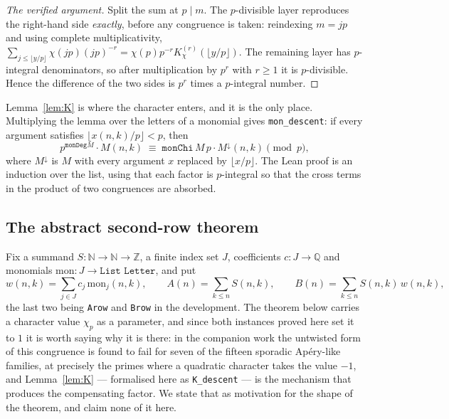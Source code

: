 \documentclass[11pt,reqno]{amsart}
\theoremstyle{plain}
\theoremstyle{definition}
\theoremstyle{remark}
\newcommand{\Z}{\mathbb{Z}}
\newcommand{\Q}{\mathbb{Q}}
\newcommand{\N}{\mathbb{N}}
\newcommand{\Ln}[1]{\texttt{#1}}
\numberwithin{equation}{section}
\begin{document}
\begin{proof}[The verified argument]
Split the sum at $p\mid m$. The $p$-divisible layer reproduces the right-hand side
\emph{exactly}, before any congruence is taken: reindexing $m=jp$ and using complete
multiplicativity,
$\sum_{j\le\lfloor y/p\rfloor}\chi(jp)(jp)^{-r}=\chi(p)p^{-r}K^{(r)}_\chi(\lfloor
y/p\rfloor)$. The remaining layer has $p$-integral denominators, so after multiplication by
$p^{r}$ with $r\ge1$ it is $p$-divisible. Hence the difference of the two sides is
$p^r$ times a $p$-integral number.
\end{proof}

Lemma~\ref{lem:K} is where the character enters, and it is the only place. Multiplying the
lemma over the letters of a monomial gives \Ln{mon\_descent}: if every argument satisfies
$\lfloor x(n,k)/p\rfloor<p$, then
\[
   p^{\Ln{monDeg}M}\cdot M(n,k)\;\equiv\;\Ln{monChi}\,M\,p\cdot M^{\downarrow}(n,k)\pmod p,
\]
where $M^\downarrow$ is $M$ with every argument $x$ replaced by $\lfloor x/p\rfloor$. The
Lean proof is an induction over the list, using that each factor is $p$-integral so that the
cross terms in the product of two congruences are absorbed.

\subsection{The abstract second-row theorem}

Fix a summand $S:\N\to\N\to\Z$, a finite index set $J$, coefficients $c:J\to\Q$ and monomials
$\mathrm{mon}:J\to\Ln{List Letter}$, and put
\[
   w(n,k)=\sum_{j\in J}c_j\,\mathrm{mon}_j(n,k),\qquad
   A(n)=\sum_{k\le n}S(n,k),\qquad
   B(n)=\sum_{k\le n}S(n,k)\,w(n,k),
\]
the last two being \Ln{Arow} and \Ln{Brow} in the development. The theorem below carries a
character value $\chi_p$ as a parameter, and since both instances proved here set it to $1$
it is worth saying why it is there: in the companion work \cite{PaperLucas} the untwisted
form of this congruence is found to fail for seven of the fifteen sporadic Ap\'ery-like
families, at precisely the primes where a quadratic character takes the value $-1$, and
Lemma~\ref{lem:K} --- formalised here as \Ln{K\_descent} --- is the mechanism that produces
the compensating factor. We state that as motivation for the shape of the theorem, and claim
none of it here.
\end{document}
